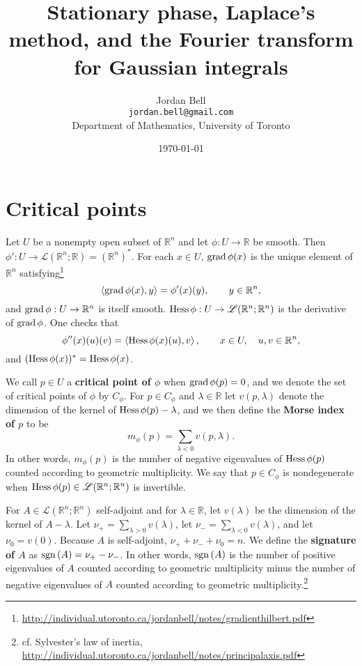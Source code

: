 \documentclass{article}
\newcommand{\inner}[2]{\left\langle #1, #2 \right\rangle}
\newcommand{\grad}{\ensuremath\mathrm{grad}\,}
\newcommand{\Hess}{\ensuremath\mathrm{Hess}\,}
\newcommand{\sgn}{\ensuremath\mathrm{sgn}\,}
\theoremstyle{definition}
\begin{document}
\title{Stationary phase,  Laplace's method, and the Fourier transform for Gaussian integrals}
\author{Jordan Bell\\ \texttt{jordan.bell@gmail.com}\\Department of Mathematics, University of Toronto}
\date{\today}

\maketitle

\section{Critical points}
Let $U$ be a nonempty open subset of $\mathbb{R}^n$ and let
 $\phi:U \to \mathbb{R}$ be smooth. Then $\phi':U \to \mathscr{L}(\mathbb{R}^n;\mathbb{R})
=(\mathbb{R}^n)^*$. 
For each $x \in U$, $\grad \phi(x)$ is the unique element of $\mathbb{R}^n$ satisfying\footnote{\url{http://individual.utoronto.ca/jordanbell/notes/gradienthilbert.pdf}}
\[
\inner{\grad \phi(x)}{y} = \phi'(x)(y),\qquad y\in \mathbb{R}^n,
\]
and $\grad \phi:U \to \mathbb{R}^n$ is itself smooth. 
$\Hess \phi:U \to \mathscr{L}(\mathbb{R}^n;\mathbb{R}^n)$ is the derivative of $\grad \phi$. One checks that
\[
\phi''(x)(u)(v) = \inner{\Hess \phi(x)(u)}{v},\qquad x \in U,\quad u,v \in \mathbb{R}^n,
\]
and $(\Hess \phi (x))^*=\Hess \phi (x)$. 

We call $p \in U$ a \textbf{critical point of $\phi$} when $\grad \phi(p)=0$, and we denote the
set of critical points of $\phi$ by $C_\phi$. 
For $p \in C_\phi$ and $\lambda \in \mathbb{R}$ let 
$v(p,\lambda)$ denote the dimension of the kernel of
$\Hess \phi(p) - \lambda$, and we then define the \textbf{Morse index of $p$} to be
\[
m_\phi(p) = \sum_{\lambda<0} v(p,\lambda).
\]
In other words, $m_\phi(p)$ is the number of negative eigenvalues of $\Hess \phi(p)$ counted according
to geometric multiplicity. 
We say that $p \in C_\phi$ is
nondegenerate when
$\Hess \phi(p) \in \mathscr{L}(\mathbb{R}^n;\mathbb{R}^n)$ is invertible.

For $A \in \mathscr{L}(\mathbb{R}^n;\mathbb{R}^n)$  self-adjoint and for $\lambda \in \mathbb{R}$,
let
$v(\lambda)$ be the dimension of
the kernel of $A-\lambda$. Let $\nu_+=\sum_{\lambda>0} v(\lambda)$,  let
$\nu_-=\sum_{\lambda<0} v(\lambda)$, and  let $\nu_0=v(0)$. 
Because $A$ is self-adjoint,
$\nu_+ + \nu_- + \nu_0=n$. 
We define
the \textbf{signature of $A$} as  $\sgn(A)=\nu_+-\nu_-$. In other words, 
$\sgn(A)$ is the number of positive eigenvalues of $A$ counted according to geometric
 multiplicity minus the number of negative
eigenvalues of $A$ counted according to geometric multiplicity.\footnote{cf. Sylvester's law of inertia, \url{http://individual.utoronto.ca/jordanbell/notes/principalaxis.pdf}}
\end{document}
